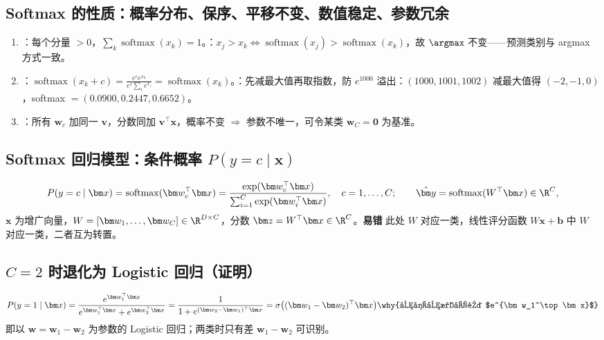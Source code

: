 \subsection{Softmax 的性质：概率分布、保序、平移不变、数值稳定、参数冗余}
\begin{enumerate}
\item {}：每个分量 $>0$，$\sum_k\operatorname{softmax}(x_k)=1$。：$x_j>x_k\iff\operatorname{softmax}(x_j)>\operatorname{softmax}(x_k)$，故 $\argmax$ 不变——预测类别与 argmax 方式一致。
\item {}：$\operatorname{softmax}(x_k+c)=\frac{e^ce^{x_k}}{e^c\sum_ie^{x_i}}=\operatorname{softmax}(x_k)$。：先减最大值再取指数，防 $e^{1000}$ 溢出：$(1000,1001,1002)$ 减最大值得 $(-2,-1,0)$，softmax $=(0.0900,0.2447,0.6652)$。
\item {}：所有 $\bm w_c$ 加同一 $\bm v$，分数同加 $\bm v^\top\bm x$，概率不变 $\Rightarrow$ 参数不唯一，可令某类 $\bm w_C=\bm 0$ 为基准。
\end{enumerate}

\subsection{Softmax 回归模型：条件概率 \texorpdfstring{$P(y=c\mid\bm x)$}{P(y=c|x)}}
\[
P(y=c\mid\bm x)=\operatorname{softmax}(\bm w_c^\top\bm x)=\frac{\exp(\bm w_c^\top\bm x)}{\sum_{i=1}^C\exp(\bm w_i^\top\bm x)},\quad c=1,\dots,C;\qquad \hat{\bm y}=\operatorname{softmax}(W^\top\bm x)\in\R^C,
\]
$\bm x$ 为增广向量，$W=[\bm w_1,\dots,\bm w_C]\in\R^{D\times C}$，分数 $\bm z=W^\top\bm x\in\R^C$。\textbf{易错} 此处 $W$ 对应一类，线性评分函数 $W\bm x+\bm b$ 中 $W$ 对应一类，二者互为转置。

\subsection{\texorpdfstring{$C=2$}{C=2} 时退化为 Logistic 回归（证明）}
\begin{align*}
P(y=1\mid\bm x)=\frac{e^{\bm w_1^\top\bm x}}{e^{\bm w_1^\top\bm x}+e^{\bm w_2^\top\bm x}}=\frac{1}{1+e^{(\bm w_2-\bm w_1)^\top\bm x}}=\sigma\big((\bm w_1-\bm w_2)^\top\bm x\big) \why{分子分母同除 $e^{\bm w_1^\top\bm x}$}
\end{align*}
即以 $\bm w=\bm w_1-\bm w_2$ 为参数的 Logistic 回归；两类时只有差 $\bm w_1-\bm w_2$ 可识别。

